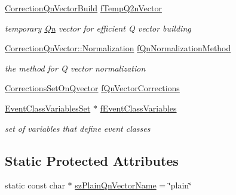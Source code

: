 \begin{DoxyCompactItemize}
\mbox{\hyperlink{classQn_1_1CorrectionQnVectorBuild}{Correction\+Qn\+Vector\+Build}} \mbox{\hyperlink{classQn_1_1DetectorConfiguration_a584998a6dccd234be7aa2bc881412dc5}{f\+Temp\+Q2n\+Vector}}
\begin{DoxyCompactList}\small\item\em temporary \mbox{\hyperlink{namespaceQn}{Qn}} vector for efficient Q vector building \end{DoxyCompactList}\item 
\mbox{\label{classQn_1_1DetectorConfiguration_a60cd5bf388c9fb4be34e779bfc56c0f4}} 
\mbox{\hyperlink{classQn_1_1CorrectionQnVector_a2998fe4babb716c57848c8c73b24a398}{Correction\+Qn\+Vector\+::\+Normalization}} \mbox{\hyperlink{classQn_1_1DetectorConfiguration_a60cd5bf388c9fb4be34e779bfc56c0f4}{f\+Qn\+Normalization\+Method}}
\begin{DoxyCompactList}\small\item\em the method for Q vector normalization \end{DoxyCompactList}\item 
\mbox{\hyperlink{classQn_1_1CorrectionsSetOnQvector}{Corrections\+Set\+On\+Qvector}} \mbox{\hyperlink{classQn_1_1DetectorConfiguration_aa25d2e08bd0e206475972657447ecf33}{f\+Qn\+Vector\+Corrections}}
\item 
\mbox{\label{classQn_1_1DetectorConfiguration_a50e96e366c1207556587c75f47b0db27}} 
\mbox{\hyperlink{classQn_1_1EventClassVariablesSet}{Event\+Class\+Variables\+Set}} $\ast$ \mbox{\hyperlink{classQn_1_1DetectorConfiguration_a50e96e366c1207556587c75f47b0db27}{f\+Event\+Class\+Variables}}
\begin{DoxyCompactList}\small\item\em set of variables that define event classes \end{DoxyCompactList}\end{DoxyCompactItemize}
\subsection*{Static Protected Attributes}
\begin{DoxyCompactItemize}
\item 
static const char $\ast$ \mbox{\hyperlink{classQn_1_1DetectorConfiguration_a72caf89bf39a06cb23346bec00948c08}{sz\+Plain\+Qn\+Vector\+Name}} = \char`\"{}plain\char`\"{}
\end{DoxyCompactItemize}
